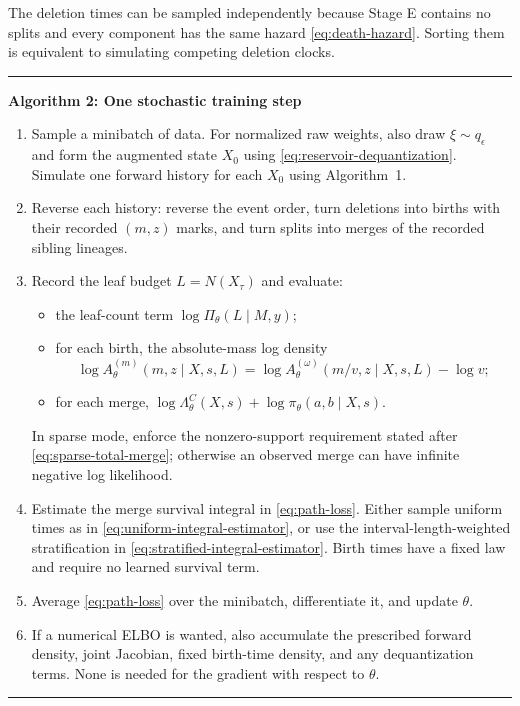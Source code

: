 \documentclass[10pt]{article}
\theoremstyle{definition}
\theoremstyle{remark}
\newenvironment{algorithmblock}[1]
{\par\medskip\noindent\begin{minipage}{\linewidth}\hrule\medskip
 \noindent\textbf{#1}\par\smallskip\small}
{\par\medskip\hrule\end{minipage}\par\medskip}
\begin{document}
The deletion times can be sampled independently because Stage E contains no splits and every component has the same hazard \eqref{eq:death-hazard}.  Sorting them is equivalent to simulating competing deletion clocks.

\begin{algorithmblock}{Algorithm 2: One stochastic training step}
\begin{enumerate}
  \item Sample a minibatch of data.  For normalized raw weights, also draw
  $\xi\sim q_\epsilon$ and form the augmented state $X_0$ using
  \eqref{eq:reservoir-dequantization}.  Simulate one forward history for
  each $X_0$ using Algorithm~1.
  \item Reverse each history: reverse the event order, turn deletions into births with their recorded $(m,z)$ marks, and turn splits into merges of the recorded sibling lineages.
  \item Record the leaf budget $L=N(X_\tau)$ and evaluate:
  \begin{itemize}
    \item the leaf-count term $\log\Pi_\theta(L\mid M,y)$;
    \item for each birth, the absolute-mass log density
    \begin{equation*}
      \log A_\theta^{(m)}(m,z\mid X,s,L)
      =\log A_\theta^{(\omega)}(m/v,z\mid X,s,L)-\log v;
    \end{equation*}
    \item for each merge,
    $\log\Lambda_\theta^C(X,s)+\log\pi_\theta(a,b\mid X,s)$.
  \end{itemize}
  In sparse mode, enforce the nonzero-support requirement stated after
  \eqref{eq:sparse-total-merge}; otherwise an observed merge can have
  infinite negative log likelihood.
  \item Estimate the merge survival integral in \eqref{eq:path-loss}.
  Either sample uniform times as in \eqref{eq:uniform-integral-estimator},
  or use the interval-length-weighted stratification in
  \eqref{eq:stratified-integral-estimator}.  Birth times have a fixed law and
  require no learned survival term.
  \item Average \eqref{eq:path-loss} over the minibatch, differentiate it, and update $\theta$.
  \item If a numerical ELBO is wanted, also accumulate the prescribed
  forward density, joint Jacobian, fixed birth-time density, and any
  dequantization terms.  None is needed for the gradient with respect to
  $\theta$.
\end{enumerate}
\end{algorithmblock}
\end{document}

